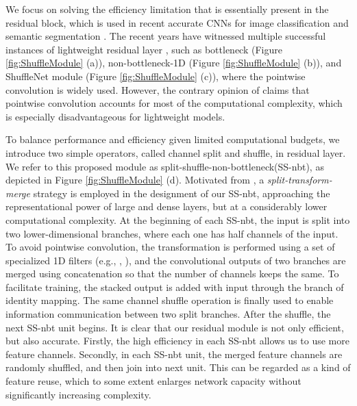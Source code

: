 \documentclass{article}
\begin{document}
We focus on solving the efficiency limitation that is essentially present in the residual block, which is used in recent accurate CNNs for image classification \cite{He2016deep,xie2017agg,zhang2018shuffle} and semantic segmentation \cite{Guosheng2017RefineNet,Paszke2016enet,Romera2018erfnet}. The recent years have witnessed multiple successful instances of lightweight residual layer \cite{Paszke2016enet,Howard2017mobile},  such as bottleneck (Figure \ref{fig:ShuffleModule} (a)), non-bottleneck-1D (Figure \ref{fig:ShuffleModule} (b)), and ShuffleNet
module (Figure \ref{fig:ShuffleModule} (c)), where the pointwise convolution is widely used.
However, the contrary opinion of \cite{zhang2018shuffle} claims that pointwise convolution accounts for most of the computational complexity, which is especially disadvantageous for lightweight models.

To balance performance and efficiency given limited computational budgets, we introduce two simple operators, called channel split and shuffle, in residual layer. We refer to this proposed module as split-shuffle-non-bottleneck(SS-nbt), as depicted in Figure \ref{fig:ShuffleModule} (d). Motivated from \cite{Rastegari2016xnor,Szegedy2016rethinking}, a \emph{split-transform-merge} strategy is employed in the designment of our SS-nbt, approaching the representational power of large and dense layers, but at a considerably lower computational complexity. At the beginning of each SS-nbt, the input is split into two lower-dimensional branches, where each one has half channels of the input. To avoid pointwise convolution, the transformation is performed using a set of specialized 1D filters (e.g., , ), and the convolutional outputs of two branches are merged using concatenation so that the number of channels keeps the same. To facilitate training, the stacked output is added with input through the branch of identity mapping. The same channel shuffle operation \cite{zhang2018shuffle} is finally used to enable information communication between two split branches. After the shuffle, the next SS-nbt unit begins. It is clear that our residual module is not only efficient, but also accurate. Firstly, the high efficiency in each SS-nbt allows us to use more feature channels. Secondly, in each SS-nbt unit, the merged feature channels are randomly shuffled, and then join into next unit. This can be regarded as a kind of feature reuse, which to some extent enlarges network capacity without significantly increasing complexity.
\end{document}
